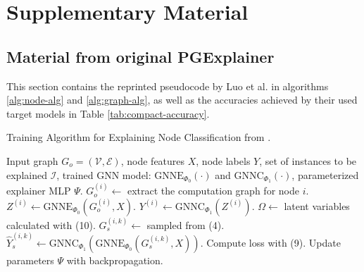 \chapter{Supplementary Material}

\section{Material from original PGExplainer}
\label{sec:PGE_material}
This section contains the reprinted pseudocode by Luo et al. \cite{luo2020parameterized} in algorithms \ref{alg:node-alg} and \ref{alg:graph-alg}, as well as the accuracies achieved by their used target models in Table \ref{tab:compact-accuracy}.

\begin{algorithm}
    \caption{Training Algorithm for Explaining Node Classification from \cite{luo2020parameterized}.}
    \label{alg:node-alg}
    \begin{algorithmic}[1]
    \REQUIRE Input graph $G_o = (\mathcal{V}, \mathcal{E})$, node features $X$, node labels $Y$, set of instances to be explained $\mathcal{I}$, trained GNN model: $\text{GNNE}_{\Phi_0}(\cdot)$ and $\text{GNNC}_{\Phi_1}(\cdot)$, parameterized explainer MLP $\Psi$.
        \STATE $G^{(i)}_o \leftarrow$ extract the computation graph for node $i$.
        \STATE $Z^{(i)} \leftarrow \text{GNNE}_{\Phi_0}(G^{(i)}_o, X)$.
        \STATE $Y^{(i)} \leftarrow \text{GNNC}_{\Phi_1}(Z^{(i)})$.
    \ENDFOR
            \STATE $\Omega \leftarrow$ latent variables calculated with (10).
                \STATE $G^{(i,k)}_s \leftarrow$ sampled from (4).
                \STATE $\hat{Y}^{(i,k)}_s \leftarrow \text{GNNC}_{\Phi_1}(\text{GNNE}_{\Phi_0}(G^{(i,k)}_s, X))$.
            \ENDFOR
        \ENDFOR
        \STATE Compute loss with (9).
        \STATE Update parameters $\Psi$ with backpropagation.
    \ENDFOR
    \end{algorithmic}
    \end{algorithm}
    
    \vspace{0.5cm}
    
